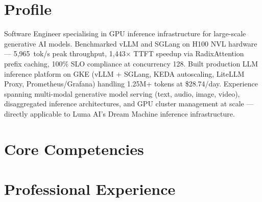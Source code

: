 \documentclass[11pt,a4paper]{moderncv}
\begin{document}
\makecvtitle

\section{Profile}
Software Engineer specialising in GPU inference infrastructure for large-scale generative AI models. Benchmarked vLLM and SGLang on H100 NVL hardware — 5,965~tok/s peak throughput, 1,443$\times$ TTFT speedup via RadixAttention prefix caching, 100\% SLO compliance at concurrency 128. Built production LLM inference platform on GKE (vLLM + SGLang, KEDA autoscaling, LiteLLM Proxy, Prometheus/Grafana) handling 1.25M+ tokens at \$28.74/day. Experience spanning multi-modal generative model serving (text, audio, image, video), disaggregated inference architectures, and GPU cluster management at scale — directly applicable to Luma AI's Dream Machine inference infrastructure.

\section{Core Competencies}

\section{Professional Experience}
\end{document}
